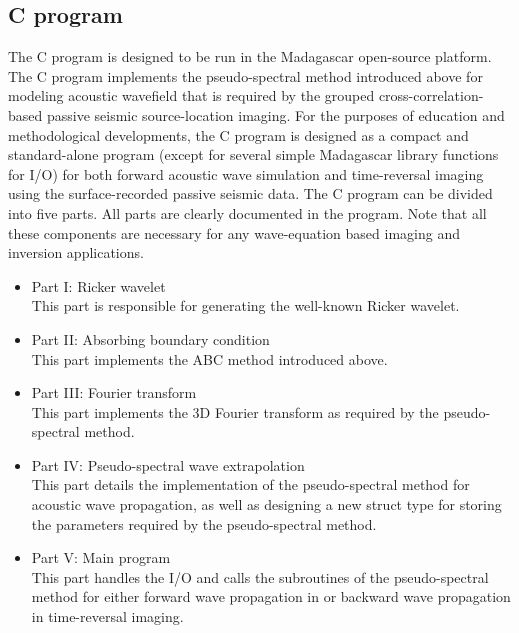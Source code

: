 \subsection{C program}
The C program is designed to be run in the Madagascar open-source platform. The C program implements the pseudo-spectral method introduced above for modeling acoustic wavefield that is required by the grouped cross-correlation-based passive seismic source-location imaging. For the purposes of education and methodological developments, the C program is designed as a compact and standard-alone program (except for several simple Madagascar library functions for I/O) for both forward acoustic wave simulation and time-reversal imaging using the surface-recorded passive seismic data. The C program can be divided into five parts. All parts are clearly documented in the program.  Note that all these components are necessary for any wave-equation based imaging and inversion applications. 
\begin{itemize}
\item Part I: 	Ricker wavelet \\
This part is responsible for generating the well-known Ricker wavelet.
\item Part II: 	 Absorbing boundary condition\\
This part implements the ABC method introduced above.
\item Part III: Fourier transform\\
This part implements the 3D Fourier transform as required by the pseudo-spectral method.
\item Part IV: Pseudo-spectral wave extrapolation \\
This part details the implementation of the pseudo-spectral method for acoustic wave propagation, as well as designing a new struct type for storing the parameters required by the pseudo-spectral method.
\item Part V: Main program \\
This part handles the I/O and calls the subroutines of the pseudo-spectral method for either forward wave propagation in  or backward  wave propagation in time-reversal imaging.
\end{itemize}


